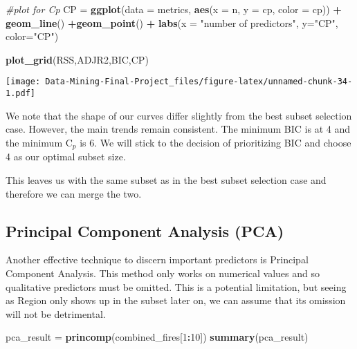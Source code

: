 \documentclass[
]{article}
\newenvironment{Shaded}{\begin{snugshade}}{\end{snugshade}}
\newcommand{\AttributeTok}[1]{\textcolor[rgb]{0.13,0.29,0.53}{#1}}
\newcommand{\CommentTok}[1]{\textcolor[rgb]{0.56,0.35,0.01}{\textit{#1}}}
\newcommand{\DecValTok}[1]{\textcolor[rgb]{0.00,0.00,0.81}{#1}}
\newcommand{\FunctionTok}[1]{\textcolor[rgb]{0.13,0.29,0.53}{\textbf{#1}}}
\newcommand{\NormalTok}[1]{#1}
\newcommand{\OtherTok}[1]{\textcolor[rgb]{0.56,0.35,0.01}{#1}}
\newcommand{\SpecialCharTok}[1]{\textcolor[rgb]{0.81,0.36,0.00}{\textbf{#1}}}
\newcommand{\StringTok}[1]{\textcolor[rgb]{0.31,0.60,0.02}{#1}}
\begin{document}
\begin{Shaded}
\begin{Highlighting}[]
\CommentTok{\#plot for Cp}
\NormalTok{CP }\OtherTok{=} \FunctionTok{ggplot}\NormalTok{(}\AttributeTok{data =}\NormalTok{ metrics, }\FunctionTok{aes}\NormalTok{(}\AttributeTok{x =}\NormalTok{ n, }\AttributeTok{y =}\NormalTok{ cp, }\AttributeTok{color =}\NormalTok{ cp)) }\SpecialCharTok{+} \FunctionTok{geom\_line}\NormalTok{() }\SpecialCharTok{+}\FunctionTok{geom\_point}\NormalTok{() }\SpecialCharTok{+} \FunctionTok{labs}\NormalTok{(}\AttributeTok{x =} \StringTok{"number of predictors"}\NormalTok{, }\AttributeTok{y=}\StringTok{"CP"}\NormalTok{, }\AttributeTok{color=}\StringTok{"CP"}\NormalTok{)}

\FunctionTok{plot\_grid}\NormalTok{(RSS,ADJR2,BIC,CP)}
\end{Highlighting}
\end{Shaded}

\texttt{[image: Data-Mining-Final-Project\_files/figure-latex/unnamed-chunk-34-1.pdf]}

We note that the shape of our curves differ slightly from the best
subset selection case. However, the main trends remain consistent. The
minimum BIC is at 4 and the minimum C\(_p\) is 6. We will stick to the
decision of prioritizing BIC and choose 4 as our optimal subset size.

This leaves us with the same subset as in the best subset selection case
and therefore we can merge the two.

\subsection{Principal Component Analysis
(PCA)}\label{principal-component-analysis-pca}

Another effective technique to discern important predictors is Principal
Component Analysis. This method only works on numerical values and so
qualitative predictors must be omitted. This is a potential limitation,
but seeing as Region only shows up in the subset later on, we can assume
that its omission will not be detrimental.

\begin{Shaded}
\begin{Highlighting}[]
\NormalTok{pca\_result }\OtherTok{=} \FunctionTok{princomp}\NormalTok{(combined\_fires[}\DecValTok{1}\SpecialCharTok{:}\DecValTok{10}\NormalTok{])}
\FunctionTok{summary}\NormalTok{(pca\_result)}
\end{Highlighting}
\end{Shaded}
\end{document}
